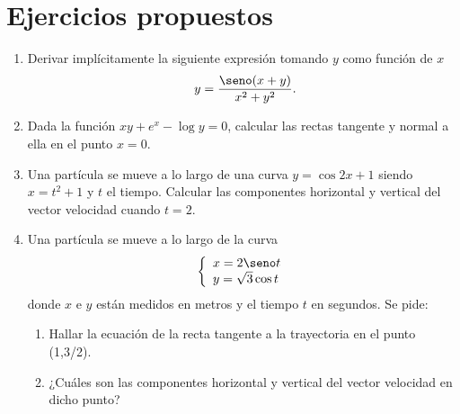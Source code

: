 \section{Ejercicios propuestos}
\begin{enumerate}[leftmargin=*]
\item Derivar implícitamente la siguiente expresión tomando $y$ como función de $x$
\[
\ y=\frac{\seno(x+y)}{x^{2}+y^{2}}.
\]
\item Dada la función $xy+e^{x}-\log{y}=0$, calcular las rectas tangente y normal a ella en el punto $x=0$.

\item Una partícula se mueve a lo largo de una curva $y=\cos{2x+1}$ siendo $x=t^2+1$ y $t$ el tiempo. Calcular las componentes horizontal y vertical del vector velocidad cuando $t=2$.

\item  Una partícula se mueve a lo largo de la curva
\[\left\{
\begin{array}{l}
x=2\seno t\\
y=\sqrt{3}\cos{t}
\end{array}
\right.
\]
donde $x$ e $y$ están medidos en metros y el tiempo $t$ en segundos.
Se pide:
\begin{enumerate}
\item Hallar la ecuación de la recta tangente a la trayectoria en el punto (1,3/2).
\item ¿Cuáles son las componentes horizontal y vertical del vector velocidad en dicho punto?
\end{enumerate}
\end{enumerate}












